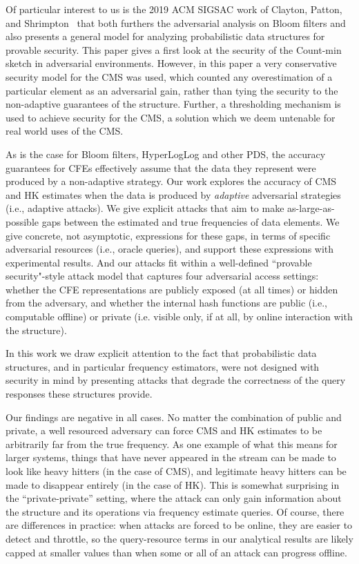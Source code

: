Of particular interest to us is the 2019 ACM SIGSAC work of Clayton, Patton, and Shrimpton~\cite{clayton2019} that both furthers the adversarial analysis on Bloom filters and also presents a general model for analyzing probabilistic data structures for provable security. This paper gives a first look at the security of the Count-min sketch in adversarial environments. However, in this paper a very conservative security model for the CMS was used, which counted any overestimation of a particular element as an adversarial gain, rather than tying the security to the non-adaptive guarantees of the structure. Further, a thresholding mechanism is used to achieve security for the CMS, a solution which we deem untenable for real world uses of the CMS. 

As is the case for Bloom filters, HyperLogLog and other PDS, the accuracy guarantees for CFEs effectively assume that the data they represent were produced by a non-adaptive strategy.  Our work explores the accuracy of CMS and HK estimates when the data is produced by \emph{adaptive} adversarial strategies (i.e., adaptive attacks).  We give explicit attacks that aim to make as-large-as-possible gaps between the estimated and true frequencies of data elements.  We give concrete, not asymptotic, expressions for these gaps, in terms of specific adversarial resources (i.e., oracle queries), and support these expressions with experimental results.  And our attacks fit within a well-defined ``provable security"-style attack model that captures four adversarial access settings: whether the CFE representations are publicly exposed (at all times) or hidden from the adversary, and whether the internal hash functions are public (i.e., computable offline) or private (i.e. visible only, if at all, by online interaction with the structure).

In this work we draw explicit attention to the fact that probabilistic data structures, and in particular frequency estimators, were not designed with security in mind by presenting attacks that degrade the correctness of the query responses these structures provide.  

Our findings are negative in all cases.  No matter the combination of public and private, a well resourced adversary can force CMS and HK estimates to be arbitrarily far from the true frequency. As one example of what this means for larger systems, things that have never appeared in the stream can be made to look like heavy hitters (in the case of CMS), and legitimate heavy hitters can be made to disappear entirely (in the case of HK).  This is somewhat surprising in the ``private-private'' setting, where the attack can only gain information about the structure and its operations via frequency estimate queries.  Of course, there are differences in practice: when attacks are forced to be online, they are easier to detect and throttle, so the query-resource terms in our analytical results are likely capped at smaller values than when some or all of an attack can progress offline. 

